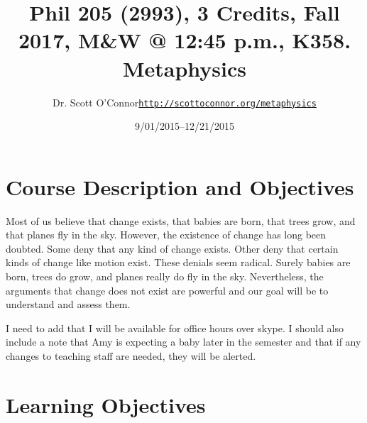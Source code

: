 \documentclass[article,oneside]{memoir}
\makeatletter
\def\myauthor{Author}
\def\mytitle{Title}
\def\mycopyright{\myauthor}
\def\myweb{\href{http://scottoconnor.org/metaphysics}{http://scottoconnor.org/metaphysics}}
\def\myauthor{Dr. Scott O'Connor}
\def\mytitle{{\normalsize Phil 205 (2993), 3 Credits, Fall 2017, M\&W @ 12:45 p.m., K358. \newline} \HUGE Metaphysics}
\makeatother
\begin{document}
\setsansfont[Mapping=tex-text]{Georgia} 
\setmonofont[Mapping=tex-text,Scale=0.8]{Georgia} 

\def\ind{\hangindent=1 true cm\hangafter=1 \noindent}
\def\labelitemi{$\cdot$}

\pagestyle{kjh}

\title{\LARGE\mytitle}     
\author{\Large\myauthor \newline \footnotesize\texttt{\noindent\myweb}}
\date{9/01/2015--12/21/2015}

\published{\,}

\maketitle




%
%

\section{Course Description and Objectives}

Most of us believe that change exists, that babies are born, that trees grow, and that planes fly in the sky. However, the existence of change has long been doubted. Some deny that any kind of change exists. Other deny that certain kinds of change like motion exist. These denials seem radical. Surely babies are born, trees do grow, and planes really do fly in the sky. Nevertheless, the arguments that change does not exist are powerful and our goal will be to understand and assess them. 

I need to add that I will be available for office hours over skype. I should also include a note that Amy is expecting a baby later in the semester and that if any changes to teaching staff are needed, they will be alerted. 

\section{Learning Objectives}
\end{document}
